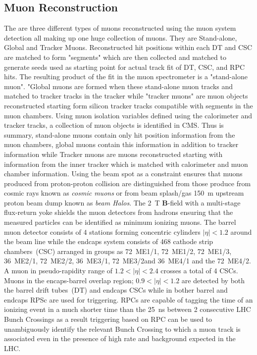 \subsection{Muon Reconstruction}
The are three different types of muons reconstructed using the muon system detection all making up one huge collection of muons. They are Stand-alone, Global and  Tracker Muons.
Reconstructed hit positions within each DT and CSC  are matched to form "segments" which are then collected and matched to generate seeds used as starting point for actual track fit of DT, CSC, and RPC hits. The resulting product of the fit in the muon spectrometer is a "stand-alone muon". "Global muons are formed when these stand-alone muon tracks and matched to tracker tracks in the tracker while "tracker muons" are muon objects reconstructed starting form silicon tracker tracks compatible with segments in the muon chambers. Using muon isolation variables defined using the calorimeter and tracker tracks, a collection of muon objects is identified in CMS. Thus is summary, stand-alone muons contain only hit position information from the muon chambers, global muons contain this information in addition to tracker information while Tracker muons are muons reconstructed starting with information from the inner tracker which is matched with calorimeter and muon chamber information. Using the beam spot as a constraint ensures that muons produced from proton-proton collision are distinguished from those produce from cosmic rays known as \textit{cosmic muons} or from beam splash/gas 150~m upstream proton beam dump known as \textit{beam Halos}. The 2~T \textbf{B}-field with a multi-stage flux-return yoke shields the muon detectors from hadrons ensuring  that the measured  particles can be identified as minimum ionizing muons. The barrel muon detector  consists of 4 stations forming concentric cylinders $|\eta| < 1.2$ around the beam line while the endcaps system consists of 468 cathode strip chambers~(CSC) arranged in groups as 72~ME1/1, 72~ME1/2, 72~ME1/3, 36~ME2/1, 72~ME2/2, 36~ME3/1, 72~ME3/2and 36~ME4/1 and the 72~ME4/2. A muon in pseudo-rapidity range of $1.2 < |\eta| < 2.4 $ crosses a total of 4 CSCs. Muons in the encaps-barrel overlap region;  $0.9 < |\eta| < 1.2 $ are detected by both the barrel drift tubes~(DT) and endcaps CSCs while in bother barrel and endcaps RPSc are used for triggering. RPCs are capable of tagging the time of an ionizing event in a much shorter time than the 25~ns between 2 consecutive LHC Bunch Crossings as a result triggering based on RPC can be used  to unambiguously identify the relevant Bunch Crossing  to which a muon track is associated even in the presence of high rate and background  expected in the LHC.
